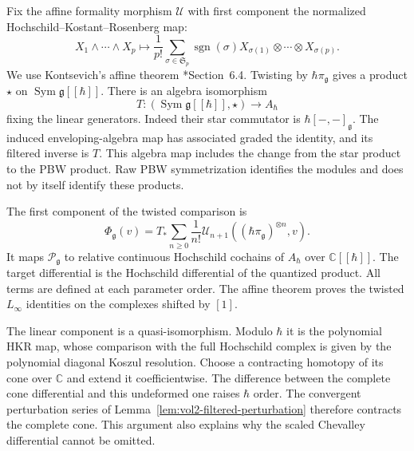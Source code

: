 Fix the affine formality morphism $\mathcal U$ with
first component the normalized
Hochschild--Kostant--Rosenberg map:
\[
 X_1\wedge\cdots\wedge X_p
 \longmapsto
 \frac1{p!}\sum_{\sigma\in\mathfrak S_p}
       \operatorname{sgn}(\sigma)
       X_{\sigma(1)}\otimes\cdots\otimes X_{\sigma(p)}.
\]
We use Kontsevich's affine theorem
\cite{KontsevichDQ}*{Section~6.4}.
Twisting by $\hbar\pi_{\mathfrak g}$ gives a product
$\star$ on $\operatorname{Sym}\mathfrak g[[\hbar]]$.
There is an algebra isomorphism
\[
 T:(\operatorname{Sym}\mathfrak g[[\hbar]],\star)
       \longrightarrow A_\hbar
\]
fixing the linear generators.
Indeed their star commutator is
$\hbar[-,-]_{\mathfrak g}$.
The induced enveloping-algebra map has associated
graded the identity, and its filtered inverse is $T$.
This algebra map includes the change from the star
product to the PBW product.
Raw PBW symmetrization identifies the modules and
does not by itself identify these products.

The first component of the twisted comparison is
\begin{equation}\label{eq:vol2-finite-formality-component}
 \Phi_{\mathfrak g}(v)
 =T_*\sum_{n\geq0}\frac1{n!}
       \mathcal U_{n+1}
       ((\hbar\pi_{\mathfrak g})^{\otimes n},v).
\end{equation}
It maps $\mathcal P_{\mathfrak g}$ to relative
continuous Hochschild cochains of $A_\hbar$ over
$\mathbb C[[\hbar]]$.
The target differential is the Hochschild differential
of the quantized product.
All terms are defined at each parameter order.
The affine theorem proves the twisted
$L_\infty$ identities on the complexes shifted by $[1]$.

The linear component is a quasi-isomorphism.
Modulo $\hbar$ it is the polynomial HKR map, whose
comparison with the full Hochschild complex is given
by the polynomial diagonal Koszul resolution.
Choose a contracting homotopy of its cone over
$\mathbb C$ and extend it coefficientwise.
The difference between the complete cone differential
and this undeformed one raises $\hbar$ order.
The convergent perturbation series of
Lemma~\ref{lem:vol2-filtered-perturbation}
therefore contracts the complete cone.
This argument also explains why the scaled
Chevalley differential cannot be omitted.

